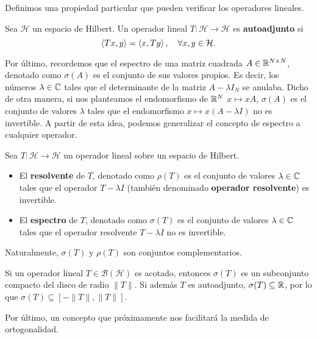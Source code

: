     Definimos una propiedad particular que pueden verificar los operadores lineales.

    \begin{definicion}
        Sea $\mathcal{H}$ un espacio de Hilbert. Un operador lineal $T:\mathcal H \longrightarrow \mathcal{H}$ es \textbf{autoadjunto} si
        \begin{equation}
            \label{eq:operador-autoadjunto}
            \left\langle Tx , y \right\rangle = \left\langle x , Ty \right\rangle, \ \ \ \forall x,y\in \mathcal H.
        \end{equation}
    \end{definicion}

    Por último, recordemos que el espectro de una matriz cuadrada $A\in\mathbb{R}^{N\times N}$, denotado como $\sigma(A)$ es el conjunto de sus valores propios. Es decir, los números $\lambda\in\mathbb{C}$ tales que el determinante de la matriz $A-\lambda I_N$ se anulaba. Dicho de otra manera, si nos planteamos el endomorfismo de $\mathbb{R}^N$ $x\mapsto xA$, $\sigma(A)$ es el conjunto de valores $\lambda$ tales que el endomorfismo $x\mapsto x(A-\lambda I)$ no es invertible. A partir de esta idea, podemos generalizar el concepto de espectro a cualquier operador.
    
    \begin{definicion}
        Sea $T:\mathcal H \longrightarrow \mathcal{H}$ un operador lineal sobre un espacio de Hilbert. 
        \begin{itemize}
            \item El \textbf{resolvente} de $T$, denotado como $\rho(T)$ es el conjunto de valores $\lambda\in\mathbb{C}$ tales que el operador $T-\lambda I$ (también denominado \textbf{operador resolvente}) es invertible.
            \item El \textbf{espectro} de $T$, denotado como $\sigma(T)$ es el conjunto de valores $\lambda\in\mathbb{C}$ tales que el operador resolvente $T-\lambda I$ no es invertible.
        \end{itemize}
        Naturalmente, $\sigma(T)$ y $\rho(T)$ son conjuntos complementarios.
    \end{definicion}

    Si un operador lineal $T\in\mathcal{B}(\mathcal{H})$ es acotado, entonces $\sigma(T)$ es un subconjunto compacto del disco de radio $\|T\|$. Si además $T$ es autoadjunto, $\sigma(T)\subseteq\mathbb{R}$, por lo que $\sigma(T)\subseteq[-\|T\|,\|T\|]$.

    Por último, un concepto que próximamente nos facilitará la medida de ortogonalidad.
    
